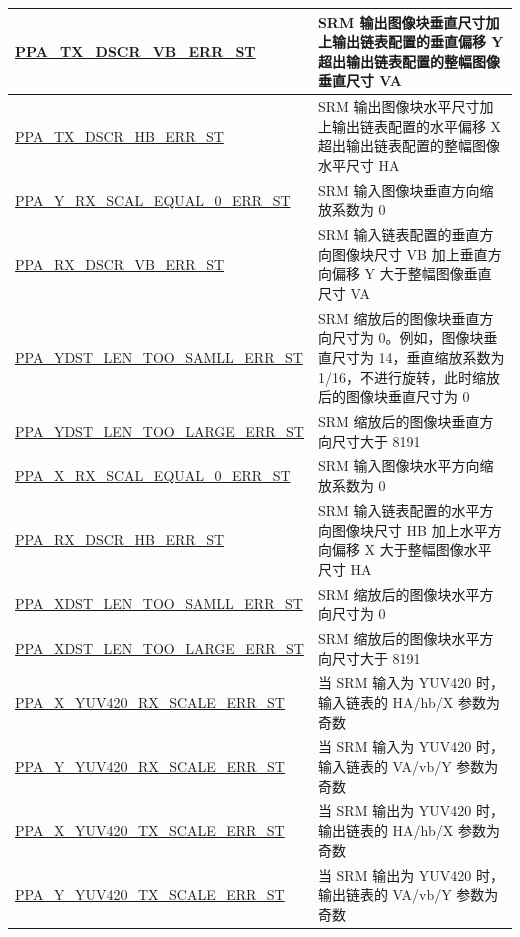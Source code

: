 \documentclass[main\_\_CN.tex]{subfiles}
\begin{document}
\begin{longtable}[c]{ |p{6cm}|p{10cm}| }
        \hyperref[fielddesc:PPATXDSCRVBERRST]{PPA\_TX\_DSCR\_VB\_ERR\_ST} & SRM 输出图像块垂直尺寸加上输出链表配置的垂直偏移 Y 超出输出链表配置的整幅图像垂直尺寸 VA \\\hline
        \hyperref[fielddesc:PPATXDSCRHBERRST]{PPA\_TX\_DSCR\_HB\_ERR\_ST} & SRM 输出图像块水平尺寸加上输出链表配置的水平偏移 X 超出输出链表配置的整幅图像水平尺寸 HA \\\hline
        \hyperref[fielddesc:PPAYRXSCALEQUAL0ERRST]{PPA\_Y\_RX\_SCAL\_EQUAL\_0\_ERR\_ST} & SRM 输入图像块垂直方向缩放系数为 0 \\\hline
        \hyperref[fielddesc:PPARXDSCRVBERRST]{PPA\_RX\_DSCR\_VB\_ERR\_ST} & SRM 输入链表配置的垂直方向图像块尺寸 VB 加上垂直方向偏移 Y 大于整幅图像垂直尺寸 VA \\\hline
        \hyperref[fielddesc:PPAYDSTLENTOOSAMLLERRST]{PPA\_YDST\_LEN\_TOO\_SAMLL\_ERR\_ST} & SRM 缩放后的图像块垂直方向尺寸为 0。例如，图像块垂直尺寸为 14，垂直缩放系数为 1/16，不进行旋转，此时缩放后的图像块垂直尺寸为 0 \\\hline
        \hyperref[fielddesc:PPAYDSTLENTOOLARGEERRST]{PPA\_YDST\_LEN\_TOO\_LARGE\_ERR\_ST} & SRM 缩放后的图像块垂直方向尺寸大于 8191 \\\hline
        \hyperref[fielddesc:PPAXRXSCALEQUAL0ERRST]{PPA\_X\_RX\_SCAL\_EQUAL\_0\_ERR\_ST} & SRM 输入图像块水平方向缩放系数为 0 \\\hline
        \hyperref[fielddesc:PPARXDSCRHBERRST]{PPA\_RX\_DSCR\_HB\_ERR\_ST} & SRM 输入链表配置的水平方向图像块尺寸 HB 加上水平方向偏移 X 大于整幅图像水平尺寸 HA \\\hline
        \hyperref[fielddesc:PPAXDSTLENTOOSAMLLERRST]{PPA\_XDST\_LEN\_TOO\_SAMLL\_ERR\_ST} & SRM 缩放后的图像块水平方向尺寸为 0 \\\hline
        \hyperref[fielddesc:PPAXDSTLENTOOLARGEERRST]{PPA\_XDST\_LEN\_TOO\_LARGE\_ERR\_ST} & SRM 缩放后的图像块水平方向尺寸大于 8191 \\\hline
        \hyperref[fielddesc:PPAXYUV420RXSCALEERRST]{PPA\_X\_YUV420\_RX\_SCALE\_ERR\_ST} & 当 SRM 输入为 YUV420 时，输入链表的 HA/hb/X 参数为奇数 \\\hline
        \hyperref[fielddesc:PPAYYUV420RXSCALEERRST]{PPA\_Y\_YUV420\_RX\_SCALE\_ERR\_ST} & 当 SRM 输入为 YUV420 时，输入链表的 VA/vb/Y 参数为奇数 \\\hline
        \hyperref[fielddesc:PPAXYUV420TXSCALEERRST]{PPA\_X\_YUV420\_TX\_SCALE\_ERR\_ST} & 当 SRM 输出为 YUV420 时，输出链表的 HA/hb/X 参数为奇数 \\\hline
        \hyperref[fielddesc:PPAYYUV420TXSCALEERRST]{PPA\_Y\_YUV420\_TX\_SCALE\_ERR\_ST} & 当 SRM 输出为 YUV420 时，输出链表的 VA/vb/Y 参数为奇数 \\\hline

\end{longtable}
\end{document}
